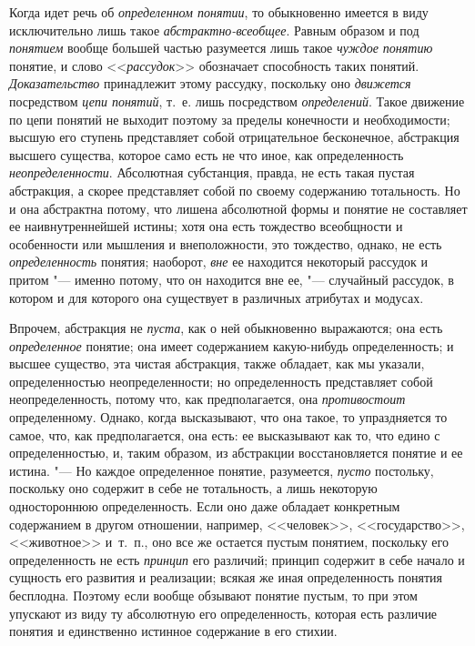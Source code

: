 Когда идет речь об
{\em определенном понятии},
то обыкновенно имеется в виду исключительно лишь такое
{\em абстрактно-всеобщее}.
Равным образом и под
{\em понятием} вообще
большей частью разумеется лишь такое
{\em чуждое понятию}
понятие, и слово
<<{\em рассудок}>>
обозначает способность таких понятий.
{\em Доказательство}
принадлежит этому рассудку, поскольку оно
{\em движется}
посредством {\em цепи
понятий}, т.~е. лишь посредством
{\em определений}. Такое
движение по цепи понятий не выходит поэтому за пределы конечности и
необходимости; высшую его ступень представляет собой отрицательное
бесконечное, абстракция высшего существа, которое само есть не что иное,
как определенность
{\em неопределенности}.
Абсолютная субстанция, правда, не есть такая пустая
абстракция, а скорее представляет собой по своему содержанию тотальность.
Но и она абстрактна потому, что лишена абсолютной формы и понятие не
составляет ее наивнутреннейшей истины; хотя она есть тождество всеобщности
и особенности или мышления и внеположности, это тождество,
однако, не есть {\em определенность}
понятия; наоборот,
{\em вне} ее находится
некоторый рассудок и притом "--- именно потому, что он
находится вне ее, "--- случайный рассудок, в котором и для
которого она существует в различных атрибутах и
модусах.

Впрочем, абстракция не
{\em пуста}, как о ней
обыкновенно выражаются; она есть
{\em определенное}
понятие; она имеет содержанием какую-нибудь определенность; и
высшее существо, эта чистая абстракция, также обладает, как мы указали,
определенностью неопределенности; но определенность представляет собой
неопределенность, потому что, как предполагается, она
{\em противостоит}
определенному. Однако, когда высказывают, что она такое, то
упраздняется то самое, что, как предполагается, она есть: ее высказывают
как то, что едино с определенностью, и, таким образом, из абстракции
восстановляется понятие и ее истина. "--- Но каждое
определенное понятие, разумеется,
{\em пусто} постольку,
поскольку оно содержит в себе не тотальность, а лишь некоторую
одностороннюю определенность. Если оно даже обладает конкретным содержанием
в другом отношении, например, <<человек>>, <<государство>>, <<животное>> и~т.~п.,
оно все же остается пустым понятием, поскольку его определенность не есть
{\em принцип} его
различий; принцип содержит в себе начало и сущность его развития и
реализации; всякая же иная определенность понятия бесплодна. Поэтому если
вообще обзывают понятие пустым, то при этом упускают из виду ту абсолютную
его определенность, которая есть различие понятия и единственно истинное
содержание в его стихии.

